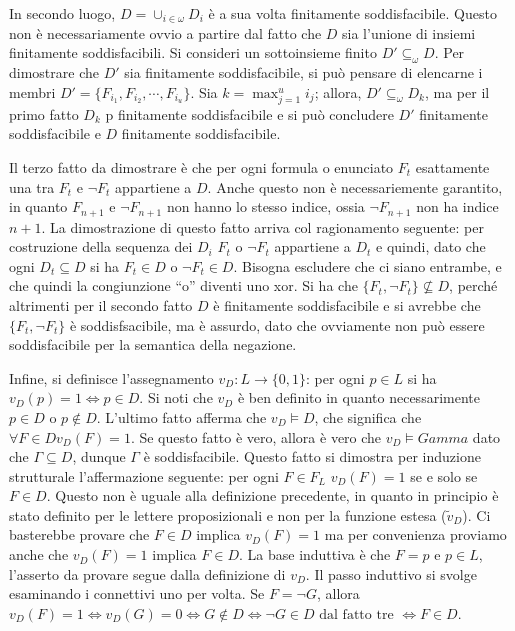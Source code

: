 In secondo luogo, $D = \cup_{i \in \omega} D_i$ è a sua volta finitamente 
soddisfacibile. Questo non è necessariamente ovvio a partire dal fatto 
che $D$ sia l'unione di insiemi finitamente soddisfacibili.
Si consideri un sottoinsieme finito $D' \subseteq_{\omega} D$. Per dimostrare 
che $D'$ sia finitamente soddisfacibile, si può pensare di elencarne 
i membri $D' = \{F_{i_1}, F_{i_2},\cdots,F_{i_u}\}$. Sia $k = \max_{j=1}^{u} i_j$; 
allora, $D' \subseteq_{\omega} D_k$, ma per il primo fatto $D_k$ p 
finitamente soddisfacibile e si può concludere $D'$ finitamente soddisfacibile
e $D$ finitamente soddisfacibile.

Il terzo fatto da dimostrare è che per ogni formula o enunciato $F_t$ esattamente 
una tra $F_t$ e $\neg F_t$ appartiene a $D$. Anche questo non è necessariemente 
garantito, in quanto $F_{n+1}$ e $\neg F_{n+1}$ non hanno lo stesso indice, 
ossia $\neg F_{n+1}$ non ha indice ${n+1}$. La dimostrazione di questo fatto 
arriva col  ragionamento seguente: per costruzione della sequenza dei $D_i$ 
$F_t$ o $\neg F_t$ appartiene a $D_t$ e quindi, dato che ogni $D_t \subseteq D$ 
si ha $F_t \in D$ o $\neg F_t \in D$. Bisogna escludere che ci siano entrambe, 
e che quindi la congiunzione ``o'' diventi uno xor. Si ha che $\{F_t, \neg F_t\} \nsubseteq D$, 
perché altrimenti per il secondo fatto $D$ è finitamente soddisfacibile e si avrebbe 
che $\{F_t, \neg F_t\}$ è soddisfsacibile, ma è assurdo, dato che ovviamente 
non può essere soddisfacibile per la semantica della negazione. 

Infine, si definisce l'assegnamento $v_D : L \rightarrow \{0,1\}$:
per ogni $p \in L$ si ha $v_D(p) = 1 \iff p \in D$. Si noti che $v_D$ è ben 
definito in quanto necessarimente $p \in D$ o $p \notin D$. L'ultimo fatto 
afferma che $v_D \models D$, che significa che $\forall F \in D v_D(F) = 1$. 
Se questo fatto è vero, allora è vero che $v_D \models Gamma$ dato che $\Gamma \subseteq D$, 
dunque $\Gamma$ è soddisfacibile. Questo fatto si dimostra per induzione 
strutturale l'affermazione seguente: per ogni $F \in F_L$ $v_D(F) = 1$ se 
e solo se $F \in D$. Questo non è uguale alla definizione precedente, in quanto 
in principio è stato definito per le lettere proposizionali e non per la 
funzione estesa ($\tilde{v}_D$). Ci basterebbe provare che $F \in D$ 
implica $v_D(F) = 1$ ma per convenienza proviamo anche che $v_D(F) = 1$ implica 
$F \in D$. La base induttiva è che $F = p$ e $p \in L$, l'asserto da 
provare segue dalla definizione di $v_D$. Il passo induttivo si svolge esaminando 
i connettivi uno per volta. Se $F = \neg G$, allora 
$v_D(F) = 1 \iff v_D(G) = 0 \iff G \notin D \iff \neg G \in D \text{ dal fatto tre }\iff F \in D$. 

